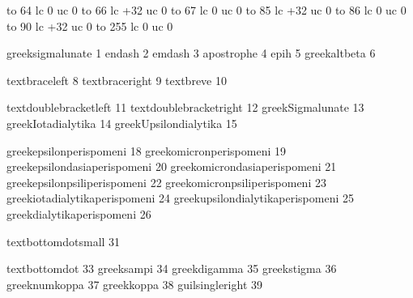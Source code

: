 
\startmapping[agr]

     to  64 lc   0 uc 0
     to  66 lc +32 uc 0
     to  67 lc   0 uc 0
     to  85 lc +32 uc 0
     to  86 lc   0 uc 0
     to  90 lc +32 uc 0
     to 255 lc   0 uc 0

\stopmapping

\startencoding[agr]

 greeksigmalunate                    1
 endash                              2
 emdash                              3
 apostrophe                          4
 epih                                5
 greekaltbeta                        6

 textbraceleft                       8
 textbraceright                      9
 textbreve                          10

 textdoublebracketleft              11
 textdoublebracketright             12
 greekSigmalunate                   13
 greekIotadialytika                 14
 greekUpsilondialytika              15

 greekepsilonperispomeni            18
 greekomicronperispomeni            19
 greekepsilondasiaperispomeni       20
 greekomicrondasiaperispomeni       21
 greekepsilonpsiliperispomeni       22
 greekomicronpsiliperispomeni       23
 greekiotadialytikaperispomeni      24
 greekupsilondialytikaperispomeni   25
 greekdialytikaperispomeni          26

 textbottomdotsmall                 31

 textbottomdot                      33
 greeksampi                         34
 greekdigamma                       35
 greekstigma                        36
 greeknumkoppa                      37
 greekkoppa                         38
 guilsingleright                    39

